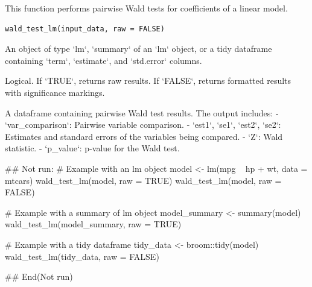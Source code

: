 \documentclass[a4paper]{book}
\begin{document}
%
\begin{Description}
This function performs pairwise Wald tests for coefficients of a linear model.
\end{Description}
%
\begin{Usage}
\begin{verbatim}
wald_test_lm(input_data, raw = FALSE)
\end{verbatim}
\end{Usage}
%
\begin{Arguments}
\begin{ldescription}
\item[\code{input\_data}] An object of type `lm`, `summary` of an `lm` object, or a tidy dataframe
containing `term`, `estimate`, and `std.error` columns.

\item[\code{raw}] Logical. If `TRUE`, returns raw results. If `FALSE`, returns formatted results with significance markings.
\end{ldescription}
\end{Arguments}
%
\begin{Value}
A dataframe containing pairwise Wald test results. The output includes:
- `var\_comparison`: Pairwise variable comparison.
- `est1`, `se1`, `est2`, `se2`: Estimates and standard errors of the variables being compared.
- `Z`: Wald statistic.
- `p\_value`: p-value for the Wald test.
\end{Value}
%
\begin{Examples}
\begin{ExampleCode}

\#\# Not run: 
# Example with an lm object
model <- lm(mpg ~ hp + wt, data = mtcars)
wald_test_lm(model, raw = TRUE)
wald_test_lm(model, raw = FALSE)

# Example with a summary of lm object
model_summary <- summary(model)
wald_test_lm(model_summary, raw = TRUE)

# Example with a tidy dataframe
tidy_data <- broom::tidy(model)
wald_test_lm(tidy_data, raw = FALSE)

## End(Not run)
\end{ExampleCode}
\end{Examples}
\end{document}
